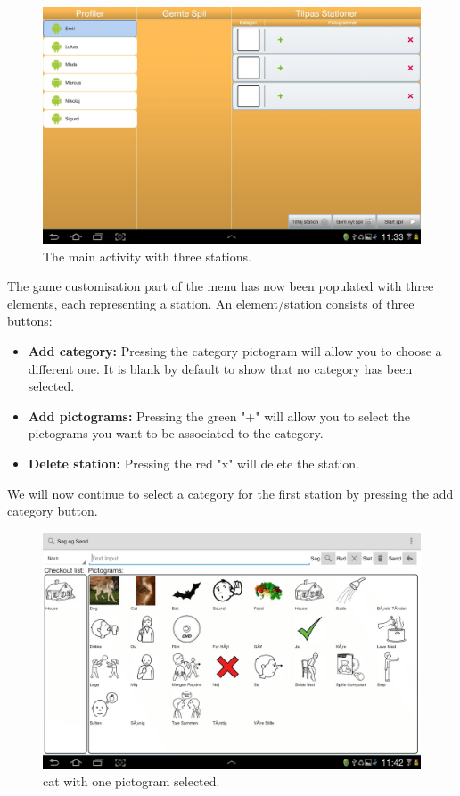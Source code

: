 \begin{figure}[H]
\centering
\includegraphics[width=1.0\linewidth]{img/screenshots/profile_flow_2.jpg}%
\caption{The main activity with three stations.}
\label{fig:profile_flow_2}
\end{figure}

The game customisation part of the menu has now been populated with three elements, each representing a station. An element/station consists of three buttons:
\begin{itemize}
\item \textbf{Add category:} Pressing the category pictogram will allow you to choose a different one. It is blank by default to show that no category has been selected.
\item \textbf{Add pictograms:} Pressing the green "+" will allow you to select the pictograms you want to be associated to the category.
\item \textbf{Delete station:} Pressing the red "x" will delete the station.
\end{itemize}
We will now continue to select a category for the first station by pressing the add category button.

\begin{figure}[H]
\centering
\includegraphics[width=1.0\linewidth]{img/screenshots/profile_flow_3.jpg}%
\caption{\ac{cat} with one pictogram selected.}
\label{fig:profile_flow_3}
\end{figure}

